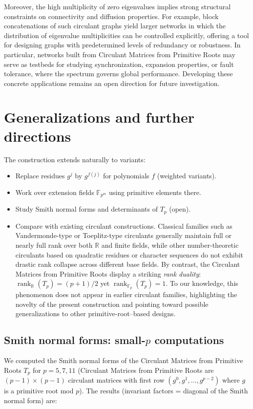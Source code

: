 \documentclass[11pt,a4paper]{article}
\theoremstyle{plain}
\theoremstyle{definition}
\begin{document}
Moreover, the high multiplicity of zero eigenvalues implies strong structural
constraints on connectivity and diffusion properties. For example, block
concatenations of such circulant graphs yield larger networks in which the
distribution of eigenvalue multiplicities can be controlled explicitly, offering a
tool for designing graphs with predetermined levels of redundancy or robustness.
In particular, networks built from Circulant Matrices from Primitive Roots may serve as testbeds for
studying synchronization, expansion properties, or fault tolerance, where the
spectrum governs global performance. Developing these concrete applications
remains an open direction for future investigation.

\section{Generalizations and further directions}
The construction extends naturally to variants:
\begin{itemize}
    \item Replace residues $g^j$ by $g^{f(j)}$ for polynomials $f$ (weighted variants).
    \item Work over extension fields $\mathbb{F}_{p^m}$ using primitive elements there.
    \item Study Smith normal forms and determinants of $T_p$ (open).
    \item Compare with existing circulant constructions. Classical families such as
    Vandermonde-type or Toeplitz-type circulants \cite{Davis,Gray} generally maintain
    full or nearly full rank over both $\mathbb{R}$ and finite fields, while other number-theoretic
    circulants based on quadratic residues or character sequences 
    do not exhibit drastic rank collapse across different base fields. By contrast, the
    Circulant Matrices from Primitive Roots display a striking \emph{rank duality}:
    $\operatorname{rank}_{\mathbb{R}}(T_p) = (p+1)/2$ yet $\operatorname{rank}_{\mathbb{F}_p}(T_p) = 1$.
    To our knowledge, this phenomenon does not appear in earlier circulant families,
    highlighting the novelty of the present construction and pointing toward possible
    generalizations to other primitive-root--based designs.
\end{itemize}

\subsection*{Smith normal forms: small-$p$ computations}
We computed the Smith normal forms of the Circulant Matrices from Primitive Roots $T_p$ for
$p=5,7,11$ (Circulant Matrices from Primitive Roots are $(p-1)\times(p-1)$ circulant matrices with
first row $(g^0,g^1,\dots,g^{p-2})$ where $g$ is a primitive root mod $p$).
The results (invariant factors = diagonal of the Smith normal form) are:
\end{document}
